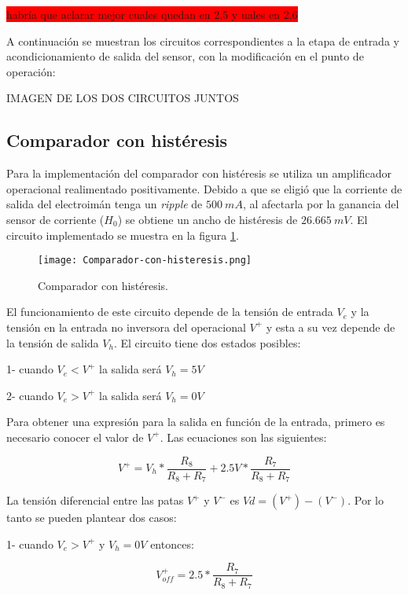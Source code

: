 \colorbox{red}{habría que aclarar mejor cuales quedan en 2.5 y uales en 2.6}

A continuación se muestran los circuitos correspondientes a la etapa de entrada y acondicionamiento de salida del sensor, con la modificación en el punto de operación:

IMAGEN DE LOS DOS CIRCUITOS JUNTOS

\subsection{Comparador con histéresis}

Para la implementación del comparador con histéresis se utiliza un amplificador operacional realimentado positivamente. Debido a que se eligió que la corriente de salida del electroimán tenga un \textsl{ripple} de $500\:mA$, al afectarla por la ganancia del sensor de corriente ($H_0$) se obtiene un ancho de histéresis de $26.665\:mV$. El circuito implementado se muestra en la figura \ref{fig:img_comp-con-hist}.

\begin{figure}[H]
	\centering
	\texttt{[image: Comparador-con-histeresis.png]}
	\caption{Comparador con histéresis.}
	\label{fig:img_comp-con-hist}
\end{figure}

El funcionamiento de este circuito depende de la tensión de entrada $V_e$ y la tensión en la entrada no inversora del operacional $V^+$ y esta a su vez depende de la tensión de salida $V_h$. El circuito tiene dos estados posibles:

1- cuando $V_e<V^+$ la salida será $V_h=5V$

2- cuando $V_e>V^+$ la salida será $V_h=0V$

Para obtener una expresión para la salida en función de la entrada, primero es necesario conocer el valor de $V^+$.
Las ecuaciones son las siguientes:

\begin{equation} 
	V^+ = V_h*\frac{R_{8}}{R_{8}+R_{7}} + 2.5V*\frac{R_{7}}{R_{8}+R_{7}}
\end{equation} 

La tensión diferencial entre las patas $V^+$ y $V^-$ es $Vd=(V^+)-(V^-)$. Por lo tanto se pueden plantear dos casos: 

1- cuando $V_e>V^+$  y $V_h=0V$ entonces:

\begin{equation}
	V^+_{off}=2.5*\frac{R_{7}}{R_{8}+R_{7}}
\end{equation}

